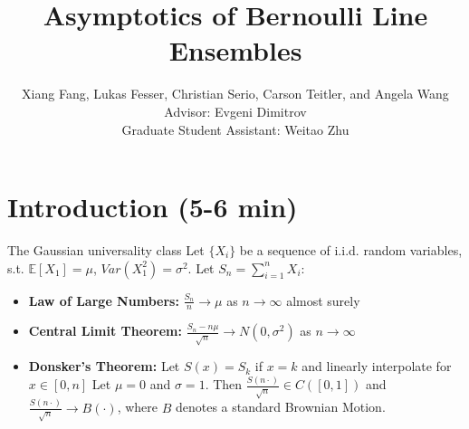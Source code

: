 \documentclass[9pt,t,dvipsnames]{beamer}
\title{Asymptotics of Bernoulli Line Ensembles}
\author[Fang, Fesser, Serio, Teitler, and Wang]{Xiang Fang, Lukas Fesser, Christian Serio, Carson Teitler, and Angela Wang \\
Advisor: Evgeni Dimitrov\\
Graduate Student Assistant: Weitao Zhu}
\institute[Columbia]{Columbia University REU}
\begin{document}
	
	\begin{frame}
		\maketitle
	\end{frame}


\section{Introduction (5-6 min)}

\begin{frame}{The Gaussian universality class}
Let $\{X_i\}$ be a sequence of i.i.d. random variables, s.t. $\mathbb{E}[X_1] = \mu$, $Var(X_1^2) = \sigma^2$. Let $S_n = \sum_{i = 1}^n X_i$:

\bigskip

\begin{itemize}
\item \textbf{Law of Large Numbers:} $\frac{S_n}{n} \rightarrow \mu$ as $n \rightarrow \infty$ almost surely

\bigskip

\item \textbf{Central Limit Theorem:} $\frac{S_n - n \mu}{\sqrt{n}} \rightarrow N(0, \sigma^2)$ as $n \rightarrow \infty$

\bigskip

\item \textbf{Donsker's Theorem:} Let $S(x) = S_k$ if $x = k$ and linearly interpolate for $x \in [0, n]$ Let $\mu = 0$ and $\sigma = 1$. Then $\frac{S(n\cdot)}{\sqrt{n}} \in C([0, 1])$ and $\frac{S(n\cdot)}{\sqrt{n}} \rightarrow B(\cdot)$, where $B$ denotes a standard Brownian Motion.

\end{itemize}


\end{frame}
\end{document}
